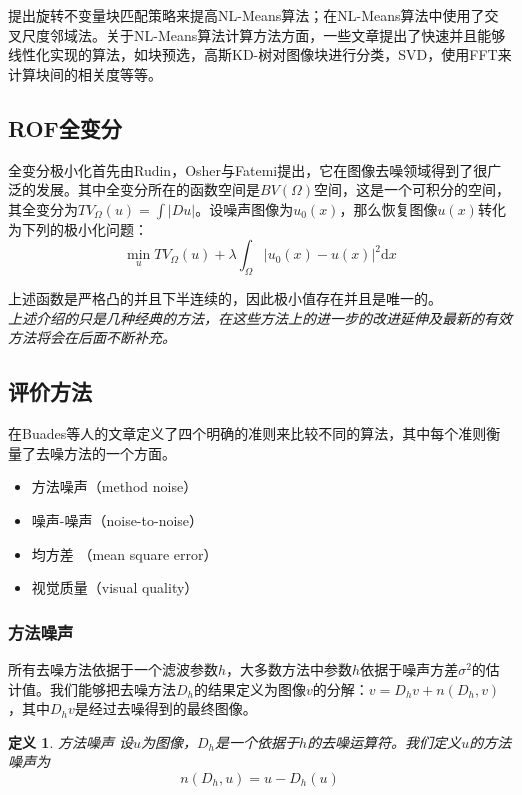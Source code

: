 \documentclass[a4paper,12pt]{article}
\begin{document}
\cite{zimmer2008rotationally}提出旋转不变量块匹配策略来提高NL-Means算法；\cite{ebrahimi2008examining}在NL-Means算法中使用了交叉尺度邻域法。关于NL-Means算法计算方法方面，一些文章提出了快速并且能够线性化实现的算法，如块预选\cite{bilcu2008combined}，高斯KD-树对图像块进行分类\cite{adams2009gaussian}，SVD\cite{orchard2008efficient}，使用FFT来计算块间的相关度\cite{wang2006fast}等等。

\subsection{ROF全变分}
全变分极小化首先由Rudin，Osher与Fatemi\cite{rudin1992nonlinear}提出，它在图像去噪领域得到了很广泛的发展。其中全变分所在的函数空间是$BV(\Omega)$空间，这是一个可积分的空间，其全变分为$TV_{\Omega}(u)=\int|Du|$。设噪声图像为$u_0(x)$，那么恢复图像$u(x)$转化为下列的极小化问题：
\begin{displaymath}
\min_uTV_{\Omega}(u)+\lambda\int_{\Omega}|u_0(x)-u(x)|^2\mathrm{d}x
\end{displaymath}

上述函数是严格凸的并且下半连续的，因此极小值存在并且是唯一的。\\

\emph{上述介绍的只是几种经典的方法，在这些方法上的进一步的改进延伸及最新的有效方法将会在后面不断补充。}

\subsection{评价方法}
在Buades等人的文章\cite{buades2010image}定义了四个明确的准则来比较不同的算法，其中每个准则衡量了去噪方法的一个方面。
\begin{itemize}
\item 方法噪声（method noise）
\item 噪声-噪声（noise-to-noise）
\item 均方差 （mean square error）
\item 视觉质量（visual quality）
\end{itemize}

\subsubsection{方法噪声}
所有去噪方法依据于一个滤波参数$h$，大多数方法中参数$h$依据于噪声方差$\sigma^2$的估计值。我们能够把去噪方法$D_h$的结果定义为图像$v$的分解：$v=D_hv+n(D_h,v)$，其中$D_hv$是经过去噪得到的最终图像。
\theoremstyle{plain}
\newtheorem{definition}{定义}
\begin{definition}{方法噪声}
设$u$为图像，$D_h$是一个依据于$h$的去噪运算符。我们定义$u$的方法噪声为
\begin{displaymath}
n(D_h,u)=u-D_h(u)
\end{displaymath}
\end{definition}
\end{document}
